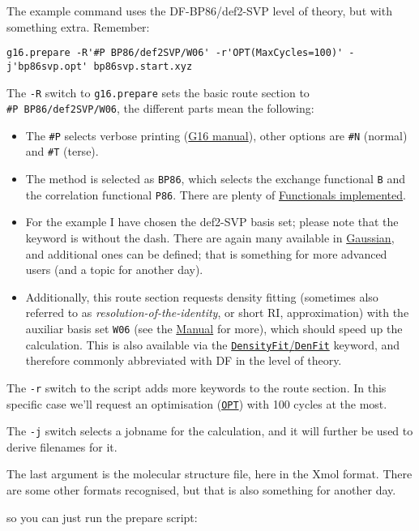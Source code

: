 \documentclass[   %
  final,          %
  a4paper         %
]{article}
\begin{document}
\begin{enumerate}
{  The example command uses the DF-BP86/def2-SVP level of theory, but
  with something extra. Remember:

  \lstinline`g16.prepare -R'#P BP86/def2SVP/W06' -r'OPT(MaxCycles=100)' -j'bp86svp.opt' bp86svp.start.xyz`

  The \lstinline`-R` switch to \lstinline`g16.prepare` sets the basic route section to
  \texttt{\#P\ BP86/def2SVP/W06}, the different parts mean the following:

  \begin{itemize}
  \item
    The \texttt{\#P} selects verbose printing
    (\href{http://gaussian.com/route/?tabid=1}{G16 manual}), other
    options are \texttt{\#N} (normal) and \texttt{\#T} (terse).
  \item
    The method is selected as \texttt{BP86}, which selects the exchange
    functional \texttt{B} and the correlation functional \texttt{P86}.
    There are plenty of \href{http://gaussian.com/dft/}{Functionals
    implemented}.
  \item
    For the example I have chosen the def2-SVP basis set; please note
    that the keyword is without the dash. There are again many available
    in \href{http://gaussian.com/basissets/}{Gaussian}, and additional
    ones can be defined; that is something for more advanced users (and
    a topic for another day).
  \item
    Additionally, this route section requests density fitting (sometimes
    also referred to as \emph{resolution-of-the-identity}, or short RI,
    approximation) with the auxiliar basis set \texttt{W06} (see the
    \href{http://gaussian.com/basissets/?tabid=2}{Manual} for more),
    which should speed up the calculation. This is also available via
    the \href{http://gaussian.com/densityfit/}{\texttt{DensityFit}/\texttt{DenFit}}
    keyword, and therefore commonly abbreviated with DF in the level of
    theory.
  \end{itemize}

  The \lstinline`-r` switch to the script adds more keywords to the route
  section. In this specific case we'll request an optimisation
  (\href{http://gaussian.com/opt/}{\texttt{OPT}}) with 100 cycles at the
  most.

  The \lstinline`-j` switch selects a jobname for the calculation, and it
  will further be used to derive filenames for it.

  The last argument is the molecular structure file, here in the Xmol
  format. There are some other formats recognised, but that is also
  something for another day.}
  so you can just run the prepare script:


\end{enumerate}
\end{document}
